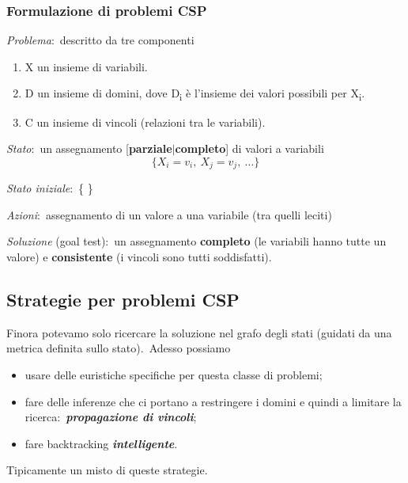 \subsubsection{Formulazione di problemi CSP}

\textit{Problema}:\ descritto da tre componenti
\begin{enumerate}
	\item X un insieme di variabili.
	\item D un insieme di domini, dove D\textsubscript{i} è l'insieme dei valori possibili per X\textsubscript{i}.
	\item C un insieme di vincoli (relazioni tra le variabili).
\end{enumerate}
\begin{flushleft}
	\textit{Stato}:\ un assegnamento [\textbf{parziale}$|$\textbf{completo}] di valori a variabili
	\[
		\{X_i = v_i ,\ X_j = v_j,\ \dots\}
	\]

	\textit{Stato iniziale}:\ \{ \}

	\textit{Azioni}:\ assegnamento di un valore a una variabile (tra quelli leciti)

	\textit{Soluzione} (goal test):\
	un assegnamento \textbf{completo} (le variabili hanno tutte un valore) e \textbf{consistente} (i vincoli sono tutti soddisfatti).
\end{flushleft}

\subsection{Strategie per problemi CSP}

Finora potevamo solo ricercare la soluzione nel grafo degli stati (guidati da una metrica definita sullo stato).\
Adesso possiamo
\begin{itemize}
	\item usare delle euristiche specifiche per questa classe di problemi;
	\item fare delle inferenze che ci portano a restringere i domini e quindi a limitare la ricerca:\ \textbf{\textit{propagazione di vincoli}};
	\item fare backtracking \textbf{\textit{intelligente}}.
\end{itemize}
Tipicamente un misto di queste strategie.

